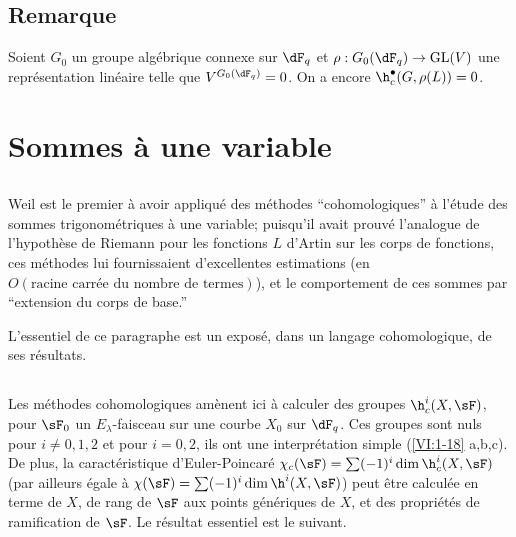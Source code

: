 \subsection{Remarque}\label{VI:2-9}

Soient $G_0$ un groupe algébrique connexe sur $\dF_q$ et 
$\rho:G_0(\dF_q) \to \operatorname{GL}(V)$ une représentation linéaire 
telle que $V^{G_0(\dF_q)}=0$. On a encore $\h_c^\bullet(G,\rho(L))=0$. 











\section{Sommes à une variable}\label{VI:3}





\subsection{}\label{VI:3-1}

Weil est le premier à avoir appliqué des méthodes ``cohomologiques'' à 
l'étude des sommes trigonométriques à une variable; puisqu'il avait 
prouvé l'analogue de l'hypothèse de Riemann pour les fonctions $L$ d'Artin 
sur les corps de fonctions, ces méthodes lui fournissaient d'excellentes 
estimations (en $O(\text{racine carrée du nombre de termes})$), et le 
comportement de ces sommes par ``extension du corps de base.'' 

L'essentiel de ce paragraphe est un exposé, dans un langage cohomologique, de 
ses résultats. 





\subsection{}\label{VI:3-2}

Les méthodes cohomologiques amènent ici à calculer des groupes 
$\h_c^i(X,\sF)$, pour $\sF_0$ un $E_\lambda$-faisceau sur une courbe $X_0$ sur 
$\dF_q$. Ces groupes sont nuls pour $i\ne 0,1,2$ et pour 
$i=0,2$, ils ont une interprétation simple (\ref{VI:1-18} a,b,c). De plus, la 
caractéristique d'Euler-Poincaré 
$\chi_c(\sF) = \sum (-1)^i \dim \h_c^i(X,\sF)$ (par ailleurs égale à 
$\chi(\sF) = \sum (-1)^i \dim \h^i(X,\sF)$) peut être calculée en terme de 
$X$, de rang de $\sF$ aux points génériques de $X$, et des propriétés 
de ramification de $\sF$. Le résultat essentiel est le suivant. 

